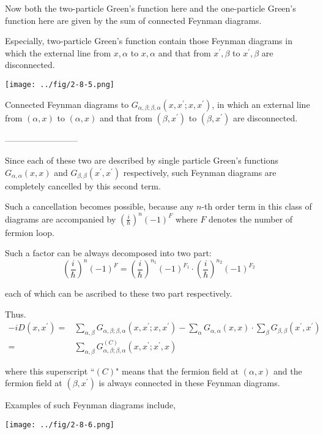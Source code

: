 Now both the two-particle Green's function here and the one-particle Green's function here are given by the sum of connected Feynman diagrams.

Especially, two-particle Green's function contain those Feynman diagrams in which the external line from $x,\alpha$ to $x,\alpha$ and that from $x^{'},\beta$ to $x^{'},\beta$ are disconnected.

\begin{center} \label{Fig2.8.5}
\texttt{[image: ../fig/2-8-5.png]}
\end{center}

Connected Feynman diagrams to $G_{\alpha,\beta;\beta,\alpha}(x,x^{'};x,x^{'})$, in which an external line from $(\alpha,x)$ to $(\alpha,x)$ and that from $(\beta,x^{'})$ to $(\beta,x^{'})$ are disconnected.

\begin{center}--------------------------\end{center}

Since each of these two are described by single particle Green's functions $G_{\alpha,\alpha}(x,x)$ and $G_{\beta,\beta}(x^{'},x^{'})$ respectively, such Feynman diagrams are completely cancelled by this second term.

Such a cancellation becomes possible, because any $n$-th order term in this class of diagrams are accompanied by $\left(\frac{i}{\hbar}\right)^n (-1)^F$ where $F$ denotes the number of fermion loop.

Such a factor can be always decomposed into two part:
\[ \left(\frac{i}{\hbar}\right)^n (-1)^F=\left(\frac{i}{\hbar}\right)^{n_1} (-1)^{F_1}\cdot\left(\frac{i}{\hbar}\right)^{n_2} (-1)^{F_2} \]

each of which can be ascribed to these two part respectively.

Thus.
\[\begin{split}
-i D(x,x^{'})=& \sum_{\alpha,\beta} G_{\alpha,\beta;\beta,\alpha}(x,x^{'};x,x^{'}) - \sum_{\alpha}G_{\alpha,\alpha}(x,x)\cdot\sum_{\beta}G_{\beta,\beta}(x^{'},x^{'})\\
=& \sum_{\alpha,\beta}G_{\alpha,\beta;\beta,\alpha}^{(C)}(x,x^{'};x^{'},x)
\end{split}\]

where this superscript ``$(C)$" means that the fermion field at $(\alpha,x)$ and the fermion field at $(\beta,x^{'})$ is always connected in these Feynman diagrams.

Examples of such Feynman diagrams include,
\begin{center} \label{Fig2.8.6}
\texttt{[image: ../fig/2-8-6.png]}
\end{center}

